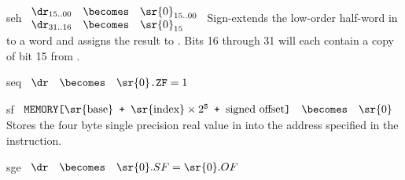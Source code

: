 \begin{instruction}{seh}
     {\exth}
     {
       \begin{math}
         \begin{array}{lcl}
           {\dr}_{15..00} & \becomes & {\sr{0}}_{15..00} \\
           {\dr}_{31..16} & \becomes & {\sr{0}}_{15} \\
         \end{array}
       \end{math}
     }
     {
       Sign-extends the low-order half-word in  to a word and
       assigns the result to \dr.  Bits 16 through 31 will each
       contain a copy of bit 15 from .
     }
\end{instruction}


\begin{instruction}{seq}
     {\seqopc}
     {
       \begin{math}
         \begin{array}{lcl}
           \dr & \becomes & \sr{0}\texttt{.ZF} = 1 \\
         \end{array}
       \end{math}
     }
\end{instruction}


\begin{instruction}{sf}
     {\sfopc}
     {
       \begin{math}
         \begin{array}{lcl}
           \texttt{MEMORY[\textrm{\sr{base}} + \(\textrm{\sr{index}}
               \times 2^\texttt{S}\) +  \textrm{signed offset}]}
           & \becomes & {\sr{0}}
         \end{array}
       \end{math}
     }
     {
       Stores the four byte single precision real value
       in  into the address specified in the instruction.
     }
\end{instruction}


\begin{instruction}{sge}
     {\sgeopc}
     {
       \begin{math}
         \begin{array}{lcl}
           \dr & \becomes & \sr{0}.SF = \sr{0}.OF \\
         \end{array}
       \end{math}
     }
\end{instruction}


